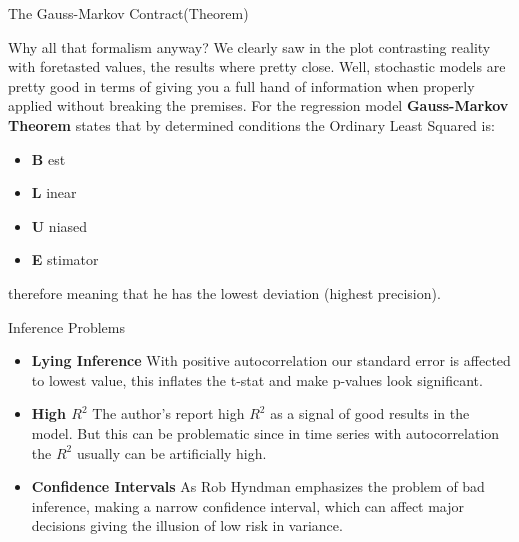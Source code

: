 \documentclass[13pt]{beamer}
\begin{document}
	\begin{frame}{The Gauss-Markov Contract(Theorem)}
		
		Why all that formalism anyway? We clearly saw in the plot contrasting reality with foretasted values, the results where pretty close. \newline
		\newline
		Well, stochastic models are pretty good in terms of giving you a full hand of information when properly applied without breaking the premises. For the regression model \textbf{Gauss-Markov Theorem} states that by determined conditions the Ordinary Least Squared is:
		\begin{itemize}
			\item \textbf{B} est
			\item \textbf{L} inear
			\item \textbf{U} niased
			\item \textbf{E} stimator
		\end{itemize}
		therefore meaning that he has the lowest deviation (highest precision).
		
	\end{frame}
	
	\begin{frame}{Inference Problems}
		\begin{itemize}
			\item \textbf{Lying Inference} \newline
			With positive autocorrelation our standard error is affected to lowest value, this inflates the t-stat and make p-values look significant.\newline
			\item \textbf{High $R^2$} \newline
			The author's report high $R^2$ as a signal of good results in the model. But this can be problematic since in time series with autocorrelation the $R^2$ usually can be artificially high.\newline
			\item \textbf{Confidence Intervals} \newline
			As Rob Hyndman emphasizes the problem of bad inference, making a narrow confidence interval, which can affect major decisions giving the illusion of low risk in variance.
		\end{itemize}
	\end{frame}
	
\end{document}
